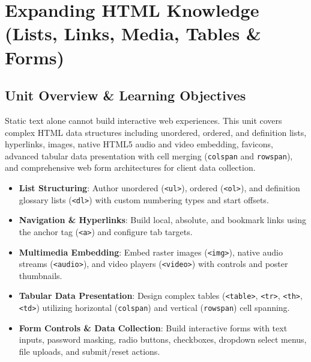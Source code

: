 \chapter{Expanding HTML Knowledge (Lists, Links, Media, Tables \& Forms)}
\label{chap:expanding-html-knowledge}

\section{Unit Overview \& Learning Objectives}

\begin{conceptbox}
Static text alone cannot build interactive web experiences. This unit covers complex HTML data structures including unordered, ordered, and definition lists, hyperlinks, images, native HTML5 audio and video embedding, favicons, advanced tabular data presentation with cell merging (\texttt{colspan} and \texttt{rowspan}), and comprehensive web form architectures for client data collection.
\end{conceptbox}

\begin{itemize}[leftmargin=1.5em]
    \item \textbf{List Structuring}: Author unordered (\texttt{<ul>}), ordered (\texttt{<ol>}), and definition glossary lists (\texttt{<dl>}) with custom numbering types and start offsets.
    \item \textbf{Navigation \& Hyperlinks}: Build local, absolute, and bookmark links using the anchor tag (\texttt{<a>}) and configure tab targets.
    \item \textbf{Multimedia Embedding}: Embed raster images (\texttt{<img>}), native audio streams (\texttt{<audio>}), and video players (\texttt{<video>}) with controls and poster thumbnails.
    \item \textbf{Tabular Data Presentation}: Design complex tables (\texttt{<table>}, \texttt{<tr>}, \texttt{<th>}, \texttt{<td>}) utilizing horizontal (\texttt{colspan}) and vertical (\texttt{rowspan}) cell spanning.
    \item \textbf{Form Controls \& Data Collection}: Build interactive forms with text inputs, password masking, radio buttons, checkboxes, dropdown select menus, file uploads, and submit/reset actions.
\end{itemize}

